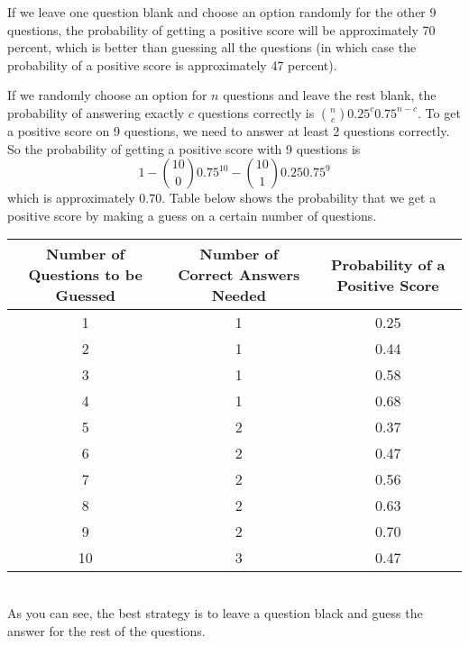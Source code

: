 \begin{solution}
If we leave one question blank and choose an option randomly for the other 9 questions, the probability of getting a positive score will be approximately 70 percent, which is better than guessing all the questions (in which case the probability of a positive score is approximately 47 percent).

If we randomly choose an option for $n$ questions and leave the rest blank, the probability of answering exactly $c$ questions correctly is $\binom{n}{c} 0.25^c 0.75^{n-c}$. To get a positive score on 9 questions, we need to answer at least 2 questions correctly. So the probability of getting a positive score with 9 questions is $$1 - \binom{10}{0} 0.75^{10} - \binom{10}{1} 0.25 0.75^{9}$$ which is approximately 0.70. Table below shows the probability that we get a positive score by making a guess on a certain number of questions.\\[0.2cm]
\begin{tabular}{|c|c|c|}
\hline
 Number of Questions to be Guessed &  Number of Correct Answers Needed &  Probability of a Positive Score \\
\hline
1 &  1 &  0.25 \\
\hline
2 &  1 &  0.44 \\
\hline
3 &  1 &  0.58 \\
\hline
4 &  1 &  0.68 \\
\hline
5 &  2 &  0.37 \\
\hline
6 &  2 &  0.47 \\
\hline
7 &  2 &  0.56 \\
\hline
8 &  2 &  0.63 \\
\hline
9 &  2 &  0.70 \\
\hline
10 &  3 &  0.47 \\
\hline
\end{tabular}
\\[0.2cm]
As you can see, the best strategy is to leave a question black and guess the answer for the rest of the questions.
\end{solution}
